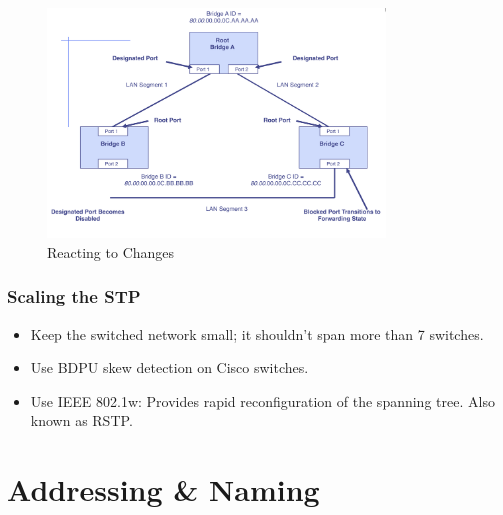 \documentclass[a4paper,11pt]{article}
\begin{document}
\begin{figure}[H]
    \centering
    \includegraphics[width=0.8\textwidth]{./images/react_to_changes.png}
    \caption{Reacting to Changes}
\end{figure}

\subsubsection{Scaling the STP}
\begin{itemize}
    \item   Keep the switched network small; it shouldn't span more than 7 switches.
    \item   Use BDPU skew detection on Cisco switches. 
    \item   Use IEEE 802.1w: Provides rapid reconfiguration of the spanning tree. Also known as RSTP.
\end{itemize}

\section{Addressing \& Naming}
\end{document}
